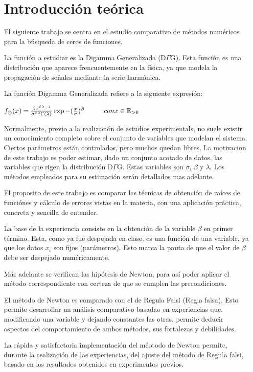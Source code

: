 \section{Introducci\'on te\'orica}

El siguiente trabajo se centra en el estudio comparativo de m\'etodos
num\'ericos para la b\'usqueda de ceros de funciones. 

La funci\'on a estudiar es la Digamma Generalizada (D$\Gamma$G). 
Esta funci\'on es una distribuci\'on que aparece frencuentemente en la f\'isica,
ya que modela la propagaci\'on de se\~nales mediante la serie harm\'onica.

La funci\'on Digamma Generalizada refiere a la siguiente expresi\'on:

\begin{center}
\begin{math}
f_{\ominus}(x) = \frac{\beta x^{\beta \lambda -1}}{\sigma ^{\beta \lambda}
\Gamma(\lambda)}\exp {-(\frac{x}{\sigma})^{\beta}} \hspace{10 mm} con x \in \mathbb{R}_{>0}
\end{math}
\end{center}

Normalmente, previo a la realizaci\'on de estudios experimentals, no suele
existir un conocimiento completo sobre el conjunto de variables que modelan
el sistema. Ciertos par\'ametros est\'an controlados, pero muchos quedan libres. 
La motivacion de este trabajo es poder estimar, dado un conjunto acotado de datos, 
las variables que rigen la distribuci\'on D$\Gamma$G. 
Estas variables son $\sigma$, $\beta$ y $\lambda$. Los m\'etodos empleados para 
su estimaci\'on ser\'an detallados mas adelante.

El proposito de este trabajo es comparar las t\'ecnicas de obtenci\'on de ra\'ices 
de funci\'ones y c\'alculo de errores vistas en la materia, 
con una aplicaci\'on pr\'actica, concreta y sencilla de entender.

La base de la experiencia consiste en la obtenci\'on de la variable $\beta$ en
primer t\'ermino. Esta, como ya fue despejada en clase, es una funci\'on
de una variable, ya que los datos $x_i$ son fijos (par\'ametros). 
Esto marca la pauta de que el valor de $\beta$ debe ser despejado
num\'ericamente. 

M\'as adelante se verifican las hip\'otesis de Newton, para as\'i poder aplicar
el m\'etodo correspondiente con certeza de que se cumplen las precondiciones.

El m\'etodo de Newton es comparado con el de Regula Falsi (Regla falsa). Esto
permite desarrollar un an\'alisis comparativo basadao en experiencias que,
modificando una variable y dejando constantes las otras, permite deducir
aspectos del comportamiento de ambos m\'etodos, sus fortalezas y debilidades.

La r\'apida y satisfactoria implementaci\'on del m\'eotodo de Newton permite,
durante la realizaci\'on de las experiencias, del ajuste del m\'etodo de Regula
falsi, basado en los resultados obtenidos en experimentos previos.
